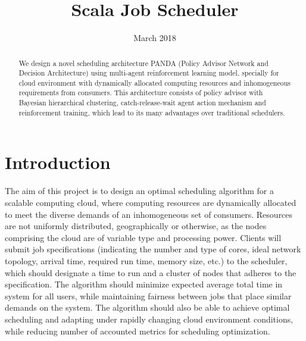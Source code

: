 \documentclass{article}
\title{Scala Job Scheduler}
\date{March 2018}
\theoremstyle{definition}
\theoremstyle{remark}
\begin{document}
	
	\maketitle
	
	\begin{abstract}
		We design a novel scheduling architecture PANDA (Policy Advisor Network and Decision Architecture) using
		multi-agent reinforcement learning model, specially for cloud environment with dynamically allocated computing
		resources and inhomogeneous requirements from consumers. This architecture consists of policy advisor with
		Bayesian hierarchical clustering, catch-release-wait agent action mechanism and reinforcement training,
		which lead to its many advantages over traditional schedulers.
	\end{abstract}
	
	\newpage
	\tableofcontents
	
	\newpage
	

	\section*{Introduction}

	\indent
	
	The aim of this project is to design an optimal scheduling algorithm for a scalable computing cloud, where computing resources are dynamically allocated to meet the diverse demands of an inhomogeneous set of consumers. Resources are not uniformly distributed, geographically or otherwise, as the nodes comprising the cloud are of variable type	and processing power. Clients will submit job specifications (indicating the number and type of cores, ideal network topology, arrival time, required run time, memory size, etc.) to the scheduler, which should designate a time to run and a cluster of nodes that adheres to the specification. The algorithm should minimize expected average total time in system for all users, while maintaining fairness between jobs that place similar demands on the system. The algorithm should also be able to achieve	optimal scheduling and adapting under rapidly changing cloud environment conditions, while reducing number of accounted metrics for scheduling optimization.
	
\end{document}
